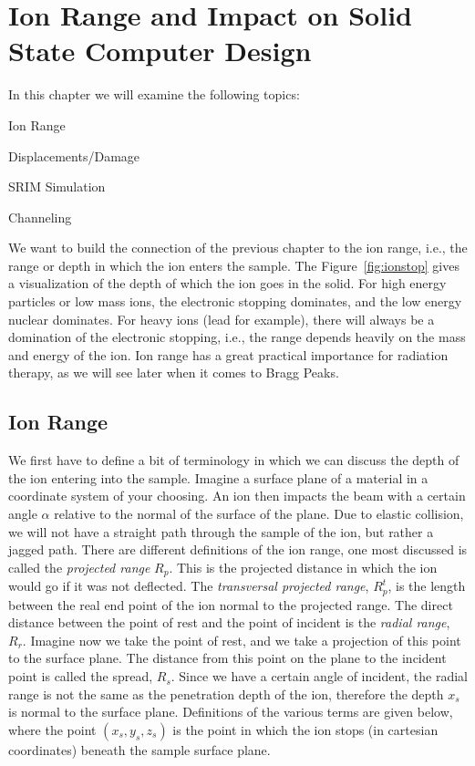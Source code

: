 

\chapter{Ion Range and Impact on Solid State Computer Design}\label{ch:ion-range-and-impact-on-solid-state-computer-design}
In this chapter we will examine the following topics:
\begin{myitemize}
	\item Ion Range
	\item Displacements/Damage
	\item SRIM Simulation
	\item Channeling
\end{myitemize}

We want to build the connection of the previous chapter to the ion range, i.e., the range or depth in which the ion enters the sample.
The Figure~\ref{fig:ionstop} gives a visualization of the depth of which the ion goes in the solid.
For high energy particles or low mass ions, the electronic stopping dominates, and the low energy nuclear dominates.
For heavy ions (lead for example), there will always be a domination of the electronic stopping, i.e., the range depends heavily on the mass and energy of the ion.
Ion range has a great practical importance for radiation therapy, as we will see later when it comes to Bragg Peaks.

\section{Ion Range}\label{sec:ion-range}
We first have to define a bit of terminology in which we can discuss the depth of the ion entering into the sample.
Imagine a surface plane of a material in a coordinate system of your choosing.
An ion then impacts the beam with a certain angle $\alpha$ relative to the normal of the surface of the plane.
Due to elastic collision, we will not have a straight path through the sample of the ion, but rather a jagged path.
There are different definitions of the ion range, one most discussed is called the \textit{projected range} $R_p$.
This is the projected distance in which the ion would go if it was not deflected.
The \textit{transversal projected range}, $R_p^t$, is the length between the real end point of the ion normal to the projected range.
The direct distance between the point of rest and the point of incident is the \textit{radial range}, $R_r$.
Imagine now we take the point of rest, and we take a projection of this point to the surface plane.
The distance from this point on the plane to the incident point is called the spread, $R_s$.
Since we have a certain angle of incident, the radial range is not the same as the penetration depth of the ion, therefore the depth $x_s$ is normal to the surface plane.
Definitions of the various terms are given below, where the point $(x_s, y_s, z_s)$ is the point in which the ion stops (in cartesian coordinates) beneath the sample surface plane.


